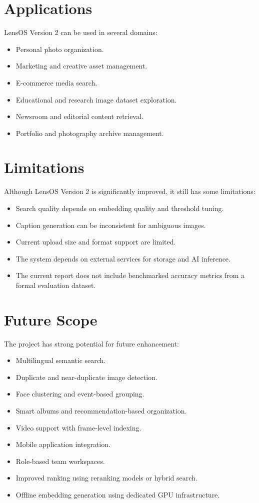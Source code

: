 \documentclass[12pt,a4paper]{report}
\begin{document}
\chapter{Applications}
LensOS Version 2 can be used in several domains:
\begin{itemize}[leftmargin=*]
    \item Personal photo organization.
    \item Marketing and creative asset management.
    \item E-commerce media search.
    \item Educational and research image dataset exploration.
    \item Newsroom and editorial content retrieval.
    \item Portfolio and photography archive management.
\end{itemize}

\chapter{Limitations}
Although LensOS Version 2 is significantly improved, it still has some limitations:
\begin{itemize}[leftmargin=*]
    \item Search quality depends on embedding quality and threshold tuning.
    \item Caption generation can be inconsistent for ambiguous images.
    \item Current upload size and format support are limited.
    \item The system depends on external services for storage and AI inference.
    \item The current report does not include benchmarked accuracy metrics from a formal evaluation dataset.
\end{itemize}

\chapter{Future Scope}
The project has strong potential for future enhancement:
\begin{itemize}[leftmargin=*]
    \item Multilingual semantic search.
    \item Duplicate and near-duplicate image detection.
    \item Face clustering and event-based grouping.
    \item Smart albums and recommendation-based organization.
    \item Video support with frame-level indexing.
    \item Mobile application integration.
    \item Role-based team workspaces.
    \item Improved ranking using reranking models or hybrid search.
    \item Offline embedding generation using dedicated GPU infrastructure.
\end{itemize}
\end{document}
